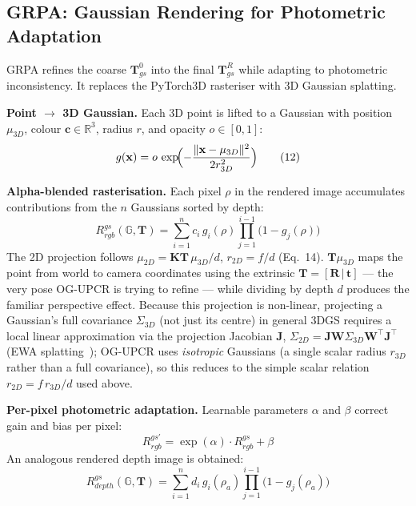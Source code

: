 \documentclass[11pt,a4paper]{article}
\begin{document}
\subsection{GRPA: Gaussian Rendering for Photometric Adaptation}
\label{sec:grpa}

GRPA refines the coarse $\mathbf{T}_{gs}^0$ into the final $\mathbf{T}_{gs}^R$ while
adapting to photometric inconsistency. It replaces the PyTorch3D rasteriser with
3D Gaussian splatting.

\textbf{Point $\to$ 3D Gaussian.} Each 3D point is lifted to a Gaussian with position
$\mu_{3D}$, colour $\mathbf{c} \in \mathbb{R}^3$, radius $r$, and opacity $o \in [0,1]$:
\begin{equation}
  g(\mathbf{x}) = o\,\exp\!\Bigl(-\frac{\lVert \mathbf{x}-\mu_{3D}\rVert^2}{2 r_{3D}^2}\Bigr)
  \tag{12}
\end{equation}

\textbf{Alpha-blended rasterisation.} Each pixel $\rho$ in the rendered image accumulates
contributions from the $n$ Gaussians sorted by depth:
\begin{equation}
  R^{gs}_{rgb}(\mathbb{G},\mathbf{T}) =
  \sum_{i=1}^{n} c_i\,g_i(\rho)\prod_{j=1}^{i-1}\bigl(1 - g_j(\rho)\bigr)
  \tag{13}
\end{equation}
The 2D projection follows $\mu_{2D} = \mathbf{K}\mathbf{T}\,\mu_{3D}/d$, $r_{2D} = f/d$
(Eq.~14). $\mathbf{T}\mu_{3D}$ maps the point from world to camera coordinates using the
extrinsic $\mathbf{T}=[\mathbf{R}\,|\,\mathbf{t}]$ — the very pose OG-UPCR is trying to
refine — while dividing by depth $d$ produces the familiar perspective effect. Because
this projection is non-linear, projecting a Gaussian's full covariance $\Sigma_{3D}$ (not
just its centre) in general 3DGS requires a local linear approximation via the projection
Jacobian $\mathbf{J}$, $\Sigma_{2D} = \mathbf{J}\mathbf{W}\Sigma_{3D}\mathbf{W}^\top
\mathbf{J}^\top$ (EWA splatting~\cite{kerbl2023gaussiansplatting}); OG-UPCR uses
\emph{isotropic} Gaussians (a single scalar radius $r_{3D}$ rather than a full covariance),
so this reduces to the simple scalar relation $r_{2D}=f\,r_{3D}/d$ used above.

\textbf{Per-pixel photometric adaptation.} Learnable parameters $\alpha$ and $\beta$
correct gain and bias per pixel:
\begin{equation}
  R^{gs'}_{rgb} = \exp(\alpha)\cdot R^{gs}_{rgb} + \beta
  \tag{15}
\end{equation}
An analogous rendered depth image is obtained:
\begin{equation}
  R^{gs}_{depth}(\mathbb{G},\mathbf{T}) =
  \sum_{i=1}^{n} d_i\,g_i(\rho_a)\prod_{j=1}^{i-1}\bigl(1 - g_j(\rho_a)\bigr)
  \tag{16}
\end{equation}
\end{document}
